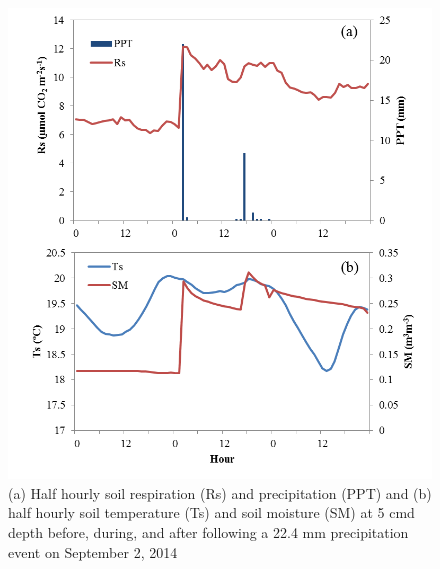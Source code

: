 \documentclass[]{elsarticle} %
\makeatletter
\def\maxwidth{\ifdim\Gin@nat@width>\linewidth\linewidth
\else\Gin@nat@width\fi}
\let\Oldincludegraphics\includegraphics
\renewcommand{\includegraphics}[1]{\Oldincludegraphics[width=\maxwidth]{#1}}
\makeatother
\begin{document}
\begin{figure}
\centering
\includegraphics{../images/static/rainEvent2014.png}
\caption{(a) Half hourly soil respiration (Rs) and precipitation (PPT)
and (b) half hourly soil temperature (Ts) and soil moisture (SM) at 5
cmd depth before, during, and after following a 22.4 mm precipitation
event on September 2, 2014 \label{fig:rainEvent2014}}
\end{figure}
\end{document}

